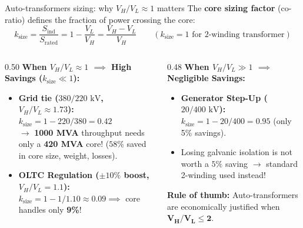 \begin{frame}{Auto-transformers sizing: why $V_H/V_L \approx 1$ matters}
\small
The \textbf{core sizing factor} (co-ratio) defines the fraction of power crossing the core:
$$k_{\text{size}} = \frac{S_{\text{ind}}}{S_{\text{rated}}} = 1 - \frac{V_L}{V_H} = \frac{V_H - V_L}{V_H} \qquad (k_{\text{size}} = 1 \text{ for 2-winding transformer})$$

\vspace{-0.1cm}
\begin{columns}[T]
    \begin{column}{0.50\textwidth}
        \textbf{When $V_H/V_L \approx 1$ $\implies$ High Savings ($k_{\text{size}} \ll 1$):}
        \begin{itemize}\setlength{\itemsep}{2pt}\footnotesize
            \item \textbf{Grid tie ($380 / 220\text{ kV}$, $V_H/V_L \approx 1.73$):}\\
            $k_{\text{size}} = 1 - 220/380 = \mathbf{0.42}$\\
            $\rightarrow$ \textbf{1000 MVA} throughput needs only a \textbf{420 MVA} core! ($58\%$ saved in core size, weight, losses).
            \item \textbf{OLTC Regulation ($\pm 10\%$ boost, $V_H/V_L = 1.1$):}\\
            $k_{\text{size}} = 1 - 1/1.10 \approx \mathbf{0.09} \implies$ core handles only \textbf{9\%}!
        \end{itemize}
    \end{column}
    \begin{column}{0.48\textwidth}
        \textbf{When $V_H/V_L \gg 1$ $\implies$ Negligible Savings:}
        \begin{itemize}\setlength{\itemsep}{2pt}\footnotesize
            \item \textbf{Generator Step-Up ($20 / 400\text{ kV}$):}\\
            $k_{\text{size}} = 1 - 20/400 = \mathbf{0.95}$ (only 5\% savings).
            \item Losing galvanic isolation is not worth a $5\%$ saving $\rightarrow$ standard 2-winding used instead!
        \end{itemize}
        
        \vspace{0.15cm}
        \alert{\textbf{Rule of thumb:}} Auto-transformers are economically justified when $\mathbf{V_H / V_L \le 2}$.
    \end{column}
\end{columns}
\end{frame}

